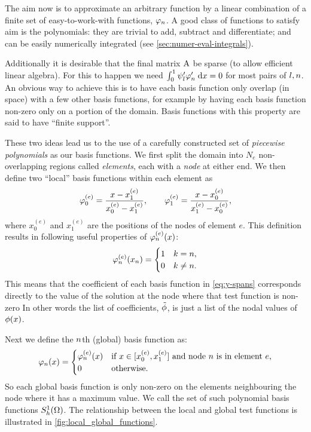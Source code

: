 {The aim now is to approximate an arbitrary function by a linear combination of a finite set of easy-to-work-with functions, $\varphi_n$.
A good class of functions to satisfy aim is the polynomials: they are trivial to add, subtract and differentiate; and can be easily numerically integrated (see \cref{sec:numer-eval-integrals}).

Additionally it is desirable that the final matrix $\mathrm{A}$ be sparse (to allow efficient linear algebra).
For this to happen we need ${\int_0^1  \psi_l'\varphi'_{n}  {\; \mathrm{{d}}}{x}} = 0$ for most pairs of $l, n$.
An obvious way to achieve this is to have each basis function only overlap (in space) with a few other basis functions, for example by having each basis function non-zero only on a portion of the domain.
Basis functions with this property are said to have ``finite support''.

These two ideas lead us to the use of a carefully constructed set of \emph{piecewise polynomials} as our basis functions.
We first split the domain into $N_e$ non-overlapping regions called \emph{elements}, each with a \emph{node} at either end.
We then define two ``local'' basis functions within each element as
\begin{equation}
  \varphi^{(e)}_{0}=\dfrac{x-x^{(e)}_{1}}{x^{(e)}_{0}-x^{(e)}_{1}},\qquad
  \varphi^{(e)}_{1}=\dfrac{x-x^{(e)}_{0}}{x^{(e)}_{1}-x^{(e)}_{0}},
  \label{eq:simple_lagrange}
\end{equation}
where $x^{(e)}_0$ and $x^{(e)}_1$ are the positions of the nodes of element $e$.
This definition results in following useful properties of $\varphi^{(e)}_{n}(x)$:
\begin{equation}
  \label{eq:35}
  \varphi^{(e)}_{n}(x_{n}) =
  \begin{cases}
    1 & k = n, \\
    0 & k \neq n.
  \end{cases}
\end{equation}
This means that the coefficient of each basis function in \cref{eq:y-spans} corresponds directly to the value of the solution at the node where that test function is non-zero
In other words the list of coefficients, $\tilde{\phi}$, is just a list of the nodal values of $\phi(x)$.

Next we define the $n$th (global) basis function as:
\begin{equation}
  \label{eq:33}
  \varphi_n(x) =
  \begin{cases}
    \varphi_n^{(e)}(x) & \text{if $x \in [x^{(e)}_0, x^{(e)}_1]$ and node $n$ is in element $e$,} \\
    0 & \text{otherwise.}
  \end{cases}
\end{equation}
So each global basis function is only non-zero on the elements neighbouring the node where it has a maximum value.
We call the set of such polynomial basis functions ${S_h^1(\Omega)}$.
The relationship between the local and global test functions is illustrated in \cref{fig:local_global_functions}.

}
